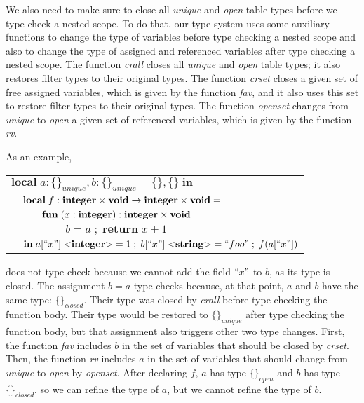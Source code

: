 We also need to make sure to close all \emph{unique} and \emph{open}
table types before we type check a nested scope.
To do that, our type system uses some auxiliary functions to change
the type of variables before type checking a nested scope and
also to change the type of assigned and referenced variables after
type checking a nested scope.
The function \emph{crall} closes all \emph{unique} and \emph{open}
table types; it also restores filter types to their original types.
The function \emph{crset} closes a given set of free assigned variables,
which is given by the function \emph{fav}, and
it also uses this set to restore filter types to their original types.
The function \emph{openset} changes from \emph{unique} to \emph{open}
a given set of referenced variables, which is given by the function \emph{rv}.

As an example,
\begin{center}
\begin{tabular}{llll}
\multicolumn{4}{l}{$\mathbf{local} \; a:\{\}_{unique}, b:\{\}_{unique} = \{\}, \{\} \; \mathbf{in}$}\\
& \multicolumn{3}{l}{$\mathbf{local} \; f:\mathbf{integer} \times \mathbf{void} \rightarrow \mathbf{integer} \times \mathbf{void} =$}\\
& & \multicolumn{2}{l}{$\mathbf{fun} \; (x:\mathbf{integer}):\mathbf{integer} \times \mathbf{void}$}\\
& & & \multicolumn{1}{l}{$b = a \;;\; \mathbf{return} \; x + 1$}\\
& \multicolumn{3}{l}{$\mathbf{in} \; a[``x"] \; {<}\mathbf{integer}{>} = 1 \;;\; b[``x"] \; {<}\mathbf{string}{>} = ``foo" \;;\; f(a[``x"])$}
\end{tabular}
\end{center}
does not type check because we cannot add the field
$``x"$ to $b$, as its type is closed.
The assignment $b = a$ type checks because, at that point,
$a$ and $b$ have the same type: $\{\}_{closed}$.
Their type was closed by \emph{crall} before type checking
the function body.
Their type would be restored to $\{\}_{unique}$ after type checking
the function body, but that assignment also triggers other two type changes.
First, the function \emph{fav} includes $b$ in the set of variables
that should be closed by \emph{crset}.
Then, the function \emph{rv} includes $a$ in the set of variables
that should change from \emph{unique} to \emph{open} by \emph{openset}.
After declaring $f$, $a$ has type $\{\}_{open}$ and $b$ has type $\{\}_{closed}$,
so we can refine the type of $a$, but we cannot refine the type of $b$.


